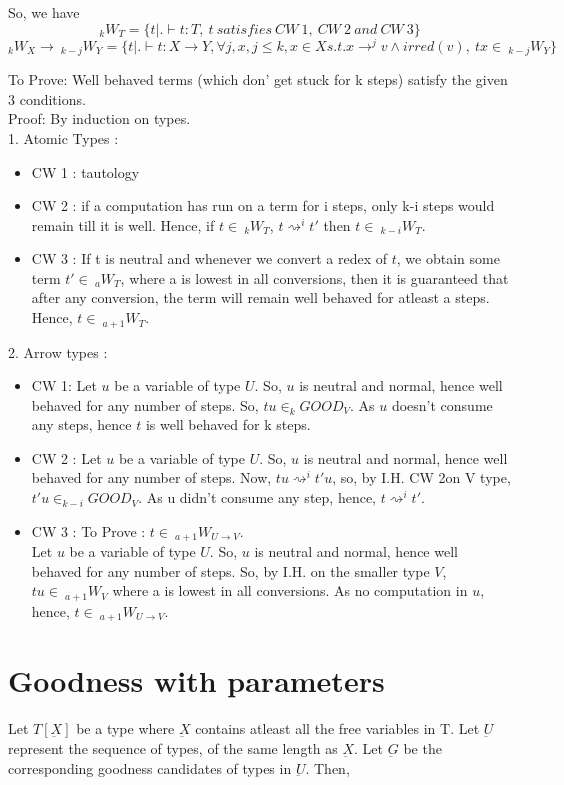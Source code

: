 \documentclass[12pt]{article}
\begin{document}
So, we have\\
$$
 _kW_T = \{t | . \vdash t : T,\ t\ satisfies\ CW\ 1,\ CW\ 2\ and\ CW\ 3\}
$$
$$
_kW_X \rightarrow\ _{k-j}W_Y = \{t | . \vdash t : X \rightarrow
Y,\forall j,x, j \leq k, x \in X s.t. x \rightarrow^j v \wedge
irred(v),\ tx \in\ _{k-j}W_Y \}
$$

To Prove: Well behaved terms (which don' get stuck for k steps)
satisfy the given 3 conditions.\\
Proof: By induction on types.\\
1. Atomic Types :
 \begin{itemize}
\item CW 1 : tautology
\item CW 2 : if a computation has run on a term for i steps, only k-i
  steps would remain till it is well. Hence, if $t \in\  _kW_T$, $t \rightsquigarrow^i t'$ then $t \in\
_{k-i}W_T$.
\item CW 3 : If t is neutral and whenever we convert a redex of $t$, we obtain
some term $t' \in\  _aW_T$, where a is lowest in all conversions, then
it is guaranteed that after any conversion, the term will remain well
behaved for atleast a steps. Hence, $t \in\  _{a+1}W_T$.
\end{itemize}

\vspace

2. Arrow types :
\begin{itemize}
\item CW 1: Let $u$ be a variable of type $U$. So, $u$ is neutral and
  normal, hence well behaved for any number of steps. So, $tu \in
  _kGOOD_V$. As $u$ doesn't consume any steps, hence $t$ is well
  behaved for k steps.
\item CW 2 :  Let $u$ be a variable of type $U$. So, $u$ is neutral and
  normal, hence well behaved for any number of steps. Now, $tu
  \rightsquigarrow^i t'u$, so, by I.H. CW 2on V type, $t'u \in
  _{k-i}GOOD_V$. As u didn't consume any step, hence, $t
  \rightsquigarrow^i t'$.
\item CW 3 :  To Prove : $t \in\ _{a+1}W_{U \rightarrow V}$.\\
 Let $u$ be a variable of type $U$. So, $u$ is neutral and
  normal, hence well behaved for any number of steps. So, by I.H. on
  the smaller type $V$, $tu \in\ _{a+1}W_V$ where a is lowest in all
  conversions. As no computation in $u$, hence, $t \in\ _{a+1}W_{U
    \rightarrow V}$.
\end{itemize}


\section{Goodness with parameters}
Let $T[\underbar{X}]$ be a type where $\underbar{X}$ contains atleast
all the free variables in T. Let $\underbar{U}$ represent the sequence
of types, of the same length as $\underbar{X}$. Let $\underbar{G}$ be
the corresponding goodness candidates of types in $\underbar{U}$. Then,
\end{document}
